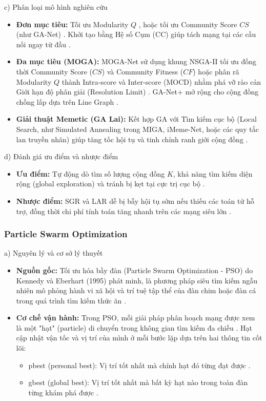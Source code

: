 \documentclass[14pt,a4paper]{extarticle}
\begin{document}
\noindent c) Phân loại mô hình nghiên cứu
\begin{itemize}
    \item \textbf{Đơn mục tiêu:} Tối ưu Modularity $Q$ \cite{Said2018, Chen2019}, hoặc tối ưu Community Score $CS$ (như GA-Net) \cite{Pizzuti2008}. Khởi tạo bằng Hệ số Cụm (CC) giúp tách mạng tại các cầu nối ngay từ đầu \cite{Said2018}.
    \item \textbf{Đa mục tiêu (MOGA):} MOGA-Net sử dụng khung NSGA-II tối ưu đồng thời Community Score ($CS$) và Community Fitness ($CF$) hoặc phân rã Modularity $Q$ thành Intra-score và Inter-score (MOCD) nhằm phá vỡ rào cản Giới hạn độ phân giải (Resolution Limit) \cite{Baraa2021, Gong2016}. GA-Net+ mở rộng cho cộng đồng chồng lấp dựa trên Line Graph \cite{Baraa2021, Bedi2016}.
    \item \textbf{Giải thuật Memetic (GA Lai):} Kết hợp GA với Tìm kiếm cục bộ (Local Search, như Simulated Annealing trong MIGA, iMeme-Net, hoặc các quy tắc lan truyền nhãn) giúp tăng tốc hội tụ và tinh chỉnh ranh giới cộng đồng \cite{Chen2019, Beldi2025, Gong2012Memetic}.
\end{itemize}

\noindent d) Đánh giá ưu điểm và nhược điểm
\begin{itemize}
    \item \textbf{Ưu điểm:} Tự động dò tìm số lượng cộng đồng $K$, khả năng tìm kiếm diện rộng (global exploration) và tránh bị kẹt tại cực trị cục bộ \cite{Said2018, Chen2019}.
    \item \textbf{Nhược điểm:} SGR và LAR dễ bị bẫy hội tụ sớm nếu thiếu các toán tử hỗ trợ, đồng thời chi phí tính toán tăng nhanh trên các mạng siêu lớn \cite{Chen2019}.
\end{itemize}

\subsubsection{Particle Swarm Optimization}

\noindent a) Nguyên lý và cơ sở lý thuyết
\begin{itemize}
    \item \textbf{Nguồn gốc:} Tối ưu hóa bầy đàn (Particle Swarm Optimization - PSO) do Kennedy và Eberhart (1995) phát minh, là phương pháp siêu tìm kiếm ngẫu nhiên mô phỏng hành vi xã hội và trí tuệ tập thể của đàn chim hoặc đàn cá trong quá trình tìm kiếm thức ăn \cite{Baraa2021}.
    \item \textbf{Cơ chế vận hành:} Trong PSO, mỗi giải pháp phân hoạch mạng được xem là một "hạt" (particle) di chuyển trong không gian tìm kiếm đa chiều \cite{Baraa2021, Beldi2025}. Hạt cập nhật vận tốc và vị trí của mình ở mỗi bước lặp dựa trên hai thông tin cốt lõi:
    \begin{itemize}
        \item pbest (personal best): Vị trí tốt nhất mà chính hạt đó từng đạt được \cite{Beldi2025}.
        \item gbest (global best): Vị trí tốt nhất mà bất kỳ hạt nào trong toàn đàn từng khám phá được \cite{Beldi2025}.
    \end{itemize}
\end{itemize}
\end{document}
